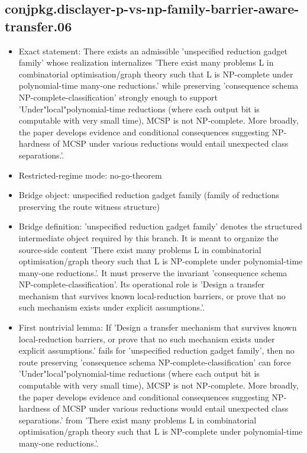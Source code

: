 \documentclass[11pt]{article}
\begin{document}
\subsection*{conjpkg.disclayer-p-vs-np-family-barrier-aware-transfer.06}
\begin{itemize}
\item Exact statement: There exists an admissible 'unspecified reduction gadget family' whose realization internalizes 'There exist many problems L in combinatorial optimisation/graph theory such that L is NP-complete under polynomial-time many-one reductions.' while preserving 'consequence schema NP-complete-classification' strongly enough to support 'Under"local"polynomial-time reductions (where each output bit is computable with very small time), MCSP is not NP-complete. More broadly, the paper develops evidence and conditional consequences suggesting NP-hardness of MCSP under various reductions would entail unexpected class separations.'.
\item Restricted-regime mode: no-go-theorem
\item Bridge object: unspecified reduction gadget family (family of reductions preserving the route witness structure)
\item Bridge definition: 'unspecified reduction gadget family' denotes the structured intermediate object required by this branch. It is meant to organize the source-side content 'There exist many problems L in combinatorial optimisation/graph theory such that L is NP-complete under polynomial-time many-one reductions.'. It must preserve the invariant 'consequence schema NP-complete-classification'. Its operational role is 'Design a transfer mechanism that survives known local-reduction barriers, or prove that no such mechanism exists under explicit assumptions.'.
\item First nontrivial lemma: If 'Design a transfer mechanism that survives known local-reduction barriers, or prove that no such mechanism exists under explicit assumptions.' fails for 'unspecified reduction gadget family', then no route preserving 'consequence schema NP-complete-classification' can force 'Under"local"polynomial-time reductions (where each output bit is computable with very small time), MCSP is not NP-complete. More broadly, the paper develops evidence and conditional consequences suggesting NP-hardness of MCSP under various reductions would entail unexpected class separations.' from 'There exist many problems L in combinatorial optimisation/graph theory such that L is NP-complete under polynomial-time many-one reductions.'.

\end{itemize}
\end{document}
